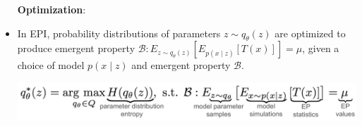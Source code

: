 \documentclass[landscape]{article}
\begin{document}
\begin{minipage}[c]{0.29\linewidth}
\begin{itemize}
\begin{center}
\end{center}
\textbf{Optimization}:
\item In EPI, probability distributions of parameters $z \sim q_\theta(z)$ are optimized to produce emergent property $\mathcal{B}: E_{z \sim q_\theta(z)} \left[ E_{p(x \mid z)} \left[T(x) \right] \right] = \mu$, given a choice of model $p(x \mid z)$ and emergent property $\mathcal{B}$. \\
\begin{center}
\includegraphics[scale=1.25]{figs/EPI_opt.pdf}
\end{center}
\end{itemize}
\end{minipage}
\end{document}
